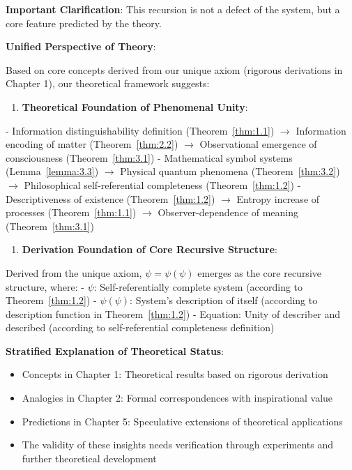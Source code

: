 \textbf{Important Clarification}: This recursion is not a defect of the system, but a core feature predicted by the theory.

\textbf{Unified Perspective of Theory}:

Based on core concepts derived from our unique axiom (rigorous derivations in Chapter 1), our theoretical framework suggests:

\begin{enumerate}
\item \textbf{Theoretical Foundation of Phenomenal Unity}:
\end{enumerate}
   - Information distinguishability definition (Theorem~\ref{thm:1.1}) $\rightarrow$ Information encoding of matter (Theorem~\ref{thm:2.2}) $\rightarrow$ Observational emergence of consciousness (Theorem~\ref{thm:3.1})
   - Mathematical symbol systems (Lemma~\ref{lemma:3.3}) $\rightarrow$ Physical quantum phenomena (Theorem~\ref{thm:3.2}) $\rightarrow$ Philosophical self-referential completeness (Theorem~\ref{thm:1.2})
   - Descriptiveness of existence (Theorem~\ref{thm:1.2}) $\rightarrow$ Entropy increase of processes (Theorem~\ref{thm:1.1}) $\rightarrow$ Observer-dependence of meaning (Theorem~\ref{thm:3.1})

\begin{enumerate}
\item \textbf{Derivation Foundation of Core Recursive Structure}:
\end{enumerate}
   Derived from the unique axiom, $\psi = \psi(\psi)$ emerges as the core recursive structure, where:
   - $\psi$: Self-referentially complete system (according to Theorem~\ref{thm:1.2})
   - $\psi(\psi)$: System's description of itself (according to description function in Theorem~\ref{thm:1.2})
   - Equation: Unity of describer and described (according to self-referential completeness definition)

\textbf{Stratified Explanation of Theoretical Status}:
\begin{itemize}
\item Concepts in Chapter 1: Theoretical results based on rigorous derivation
\item Analogies in Chapter 2: Formal correspondences with inspirational value
\item Predictions in Chapter 5: Speculative extensions of theoretical applications
\item The validity of these insights needs verification through experiments and further theoretical development
\end{itemize}


